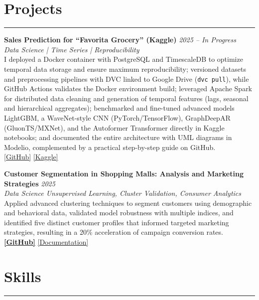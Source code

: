 \documentclass[9pt,a4paper]{article}
\begin{document}
\section*{Projects}
\vspace{-\baselineskip}
\noindent\rule{\linewidth}{0.5pt}
\noindent\textbf{Sales Prediction for “Favorita Grocery” (Kaggle)} \hfill \textit{2025 – In Progress}\\
\textit{Data Science | Time Series | Reproducibility}\\[1ex]
I deployed a Docker container with PostgreSQL and TimescaleDB to optimize temporal data storage and ensure maximum reproducibility; versioned datasets and preprocessing pipelines with DVC linked to Google Drive (\texttt{dvc pull}), while GitHub Actions validates the Docker environment build; leveraged Apache Spark for distributed data cleaning and generation of temporal features (lags, seasonal and hierarchical aggregates); benchmarked and fine-tuned advanced models LightGBM, a WaveNet-style CNN (PyTorch/TensorFlow), GraphDeepAR (GluonTS/MXNet), and the Autoformer Transformer directly in Kaggle notebooks; and documented the entire architecture with UML diagrams in Modelio, complemented by a practical step-by-step guide on GitHub.\\[1ex]
\noindent\href{https://github.com/Ares-Infenus/Retail_Sales_Trend_Analysis}{[GitHub]} \quad \href{https://www.kaggle.com/c/favorita-grocery-sales-forecasting}{[Kaggle]}

\textbf{Customer Segmentation in Shopping Malls: Analysis and Marketing Strategies} \hfill \textit{2025} \\
\textit{Data Science \textbar{} Unsupervised Learning, Cluster Validation, Consumer Analytics} \\
Applied advanced clustering techniques to segment customers using demographic and behavioral data, validated model robustness with multiple indices, and identified five distinct customer profiles that informed targeted marketing strategies, resulting in a 20\% acceleration of campaign conversion rates. \\
\textbf{\href{https://github.com/Ares-Infenus/Customer-Segmentation-in-Shopping-Malls}{[GitHub]}} \textbar{} \href{https://drive.google.com/file/d/1wPNeTWYn17Iix7GtWFPAcKPULzoskr_N/view?usp=sharing}{[Documentation]}

\vspace{-\baselineskip}
\section*{Skills}
\vspace{-\baselineskip}
\noindent\rule{\linewidth}{0.5pt}
\end{document}
